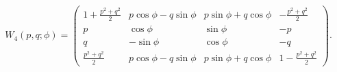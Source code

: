 \begin{equation}
W_4(p, q;  \phi) =
\left( \begin{array}{cccc}
1+ \frac{p^2 + q^2 }{2} & p\cos \phi - q \sin \phi & p\sin \phi + q \cos \phi  & -\frac{p^2 + q^2 }{2} \\
p & \cos \phi & \sin \phi  & -p \\
q & -\sin \phi & \cos \phi  & -q \\
\frac{p^2 + q^2 }{2} &  p\cos \phi -q \sin \phi & p\sin \phi + q \cos \phi  & 1
-\frac{p^2 + q^2 }{2}
\end{array}\right).
\label{2}
\end{equation}

